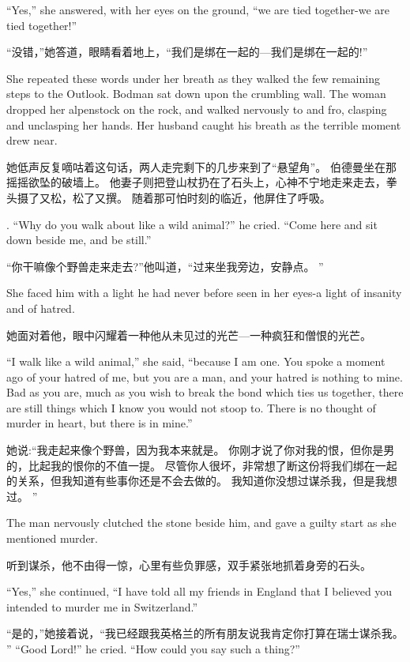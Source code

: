 \documentclass[cs4size, a4paper, 12pt]{article}
\newcounter{numpar}
\newcommand*{\newpar}{\numpar{}}
\begin{document}
	\newpar ``Yes,'' she answered, with her eyes on the ground, ``we are tied together-we are tied together!''
	
	``没错，''她答道，眼睛看着地上，``我们是绑在一起的—我们是绑在一起的!''
	
	\newpar She repeated these words under her breath as they walked the few remaining steps to the Outlook. Bodman sat down upon the crumbling wall. The woman dropped her alpenstock on the rock, and walked nervously to and fro, clasping and unclasping her hands. Her husband caught his breath as the terrible moment drew near.
	
	她低声反复嘀咕着这句话，两人走完剩下的几步来到了``悬望角''。 伯德曼坐在那摇摇欲坠的破墙上。 他妻子则把登山杖扔在了石头上，心神不宁地走来走去，拳头摄了又松，松了又撰。 随着那可怕时刻的临近，他屏住了呼吸。 
	
	. ``Why do you walk about like a wild animal?'' he cried. ``Come here and sit down beside me, and be still.''
	
	``你干嘛像个野兽走来走去?''他叫道，``过来坐我旁边，安静点。 ''
	
	\newpar She faced him with a light he had never before seen in her eyes-a light of insanity and of hatred.
	
	她面对着他，眼中闪耀着一种他从未见过的光芒—一种疯狂和僧恨的光芒。 
	
	\newpar ``I walk like a wild animal,'' she said, ``because I am one. You spoke a moment ago of your hatred of me, but you are a man, and your hatred is nothing to mine. Bad as you are, much as you wish to break the bond which ties us together, there are still things which I know you would not stoop to. There is no thought of murder in heart, but there is in mine.''
	
	她说:``我走起来像个野兽，因为我本来就是。 你刚才说了你对我的恨，但你是男的，比起我的恨你的不值一提。 尽管你人很坏，非常想了断这份将我们绑在一起的关系，但我知道有些事你还是不会去做的。 我知道你没想过谋杀我，但是我想过。 ''
	
	\newpar The man nervously clutched the stone beside him, and gave a guilty start as she mentioned murder.
	
	听到谋杀，他不由得一惊，心里有些负罪感，双手紧张地抓着身旁的石头。 
	
	\newpar ``Yes,'' she continued, ``I have told all my friends in England that I believed you intended to murder me in Switzerland.''
	
	``是的，''她接着说，``我已经跟我英格兰的所有朋友说我肯定你打算在瑞士谋杀我。 '' ``Good Lord!'' he cried. ``How could you say such a thing?''
	
\end{document}
